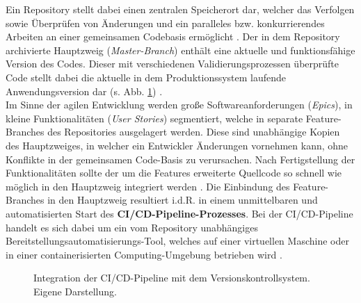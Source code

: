 Ein Repository stellt dabei einen zentralen Speicherort dar, welcher das Verfolgen sowie Überprüfen von Änderungen und ein paralleles bzw. konkurrierendes Arbeiten an einer gemeinsamen Codebasis ermöglicht \cite[1]{Blischak.2016}. Der in dem Repository archivierte Hauptzweig (\textit{Master-Branch}) enthält eine aktuelle und funktionsfähige Version des Codes. Dieser mit verschiedenen Validierungsprozessen überprüfte Code stellt dabei die aktuelle in dem Produktionssystem laufende Anwendungsversion dar (s. Abb. \ref{fig:VCS}) \cite[337]{Schmiedmayer.52220225242022}.\\ Im Sinne der agilen Entwicklung werden große Softwareanforderungen (\textit{Epics}), in kleine Funktionalitäten (\textit{User Stories}) segmentiert, welche in separate Feature-Bran\-ches des Repositories ausgelagert werden. Diese sind unabhängige Kopien des Haupt\-zweiges, in welcher ein Entwickler Änderungen vornehmen kann, ohne Konflikte in der gemeinsamen Code-Basis zu verursachen. Nach Fertigstellung der Funktionalitäten sollte der um die Features erweiterte Quellcode so schnell wie möglich in den Hauptzweig integriert werden \cite[337]{Schmiedmayer.52220225242022}. Die Einbindung des Feature-Branches in den Hauptzweig resultiert i.d.R. in einem unmittelbaren und automatisierten Start des \textbf{CI/CD-Pipeline-Prozesses}. Bei der CI/CD-Pipeline handelt es sich dabei um ein vom Repository unabhängiges Bereitstellungsautomati\-sierungs-Tool, welches auf einer virtuellen Maschine oder in einer containerisierten Computing-Umgebung betrieben wird \cite{Codefresh.20230419}.\\ 
\begin{center}
	\begin{figure}[H]\hspace*{-9mm}
		\centering
		\caption[Integration der CI/CD-Pipeline mit dem Versionskontrollsystem]{Integration der CI/CD-Pipeline mit dem Versionskontrollsystem. Eigene Darstellung.}
		\label{fig:VCS}
	\end{figure}
\end{center}
\vspace*{-15mm}
